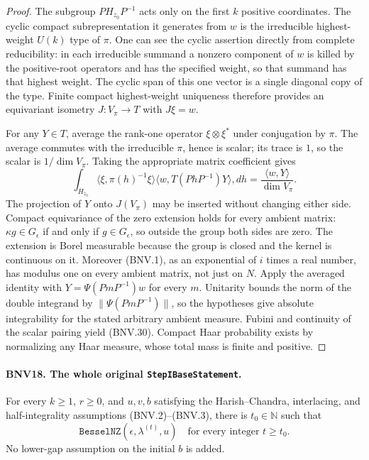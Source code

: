 \begin{proof}
The subgroup $PH_{z_0}P^{-1}$ acts only on the first $k$ positive
coordinates.  The cyclic compact subrepresentation it generates from
$w$ is the irreducible highest-weight $U(k)$ type of $\pi$.
One can see the cyclic assertion directly from complete reducibility:
in each irreducible summand a nonzero component of $w$ is killed by the
positive-root operators and has the specified weight, so that summand
has that highest weight.  The cyclic span of this one vector is a single
diagonal copy of the type.  Finite compact highest-weight uniqueness
therefore provides an equivariant isometry $J:V_\pi\to T$ with $J\xi=w$.

For any $Y\in T$, average the rank-one operator $\xi\otimes\xi^*$
under conjugation by $\pi$.  The average commutes with the irreducible
$\pi$, hence is scalar; its trace is $1$, so the scalar is
$1/\dim V_\pi$.  Taking the appropriate matrix coefficient gives
\[
 \int_{H_{z_0}}
 \langle\xi,\pi(h)^{-1}\xi\rangle
 \langle w,T(PhP^{-1})Y\rangle,dh
      =\frac{\langle w,Y\rangle}{\dim V_\pi}.
\]
The projection of $Y$ onto $J(V_\pi)$ may be inserted without changing
either side.  Compact equivariance of the zero extension holds for
every ambient matrix: $\kappa g\in G_\epsilon$ if and only if
$g\in G_\epsilon$, so outside the group both sides are zero.
The extension is Borel measurable because the group is closed and
the kernel is continuous on it.  Moreover (BNV.1), as an exponential
of $i$ times a real number, has modulus one on every ambient matrix,
not just on $N$.  Apply the averaged identity with
$Y=\Psi(PmP^{-1})w$ for every $m$.  Unitarity bounds the norm of the
double integrand by $\|\Psi(PmP^{-1})\|$, so the hypotheses give
absolute integrability for the stated arbitrary ambient measure.
Fubini and continuity of the scalar pairing yield
(BNV.30).  Compact Haar probability exists by normalizing any Haar
measure, whose total mass is finite and positive.
\end{proof}

\paragraph{BNV18. The whole original \texttt{StepIBaseStatement}.}
\label{claim:BNV18}
For every $k\ge1$, $r\ge0$, and $u,v,b$ satisfying the Harish--Chandra,
interlacing, and half-integrality assumptions (BNV.2)--(BNV.3), there is
$t_0\in\mathbb N$ such that
\[
 \texttt{BesselNZ}(\epsilon,\lambda^{(t)},u)
          \quad\text{for every integer }t\ge t_0.
 \tag{BNV.31}
\]
No lower-gap assumption on the initial $b$ is added.

